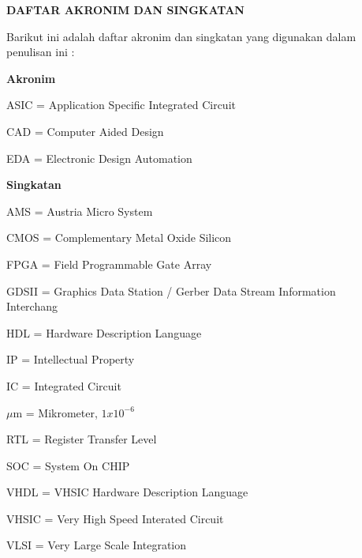 \newpage
{}
\singlespace
\begin{center}
\begin{large}\textbf{DAFTAR AKRONIM DAN SINGKATAN}\end{large}
\end{center}
 \vspace{1cm}
 Barikut ini adalah daftar akronim dan singkatan yang digunakan dalam penulisan ini :

 \noindent \begin{large}\textbf{Akronim}\end{large}
\begin{singlespacing}
\begin{abbreviations}
\item[ASIC] = Application Specific Integrated Circuit
\item[CAD] =  Computer Aided Design
\item[EDA] =  Electronic Design Automation

\end{abbreviations}

 \noindent \begin{large}\textbf{Singkatan}\end{large}
\begin{abbreviations}
\item[AMS] = Austria Micro System
\item[CMOS] = Complementary Metal Oxide Silicon
\item[FPGA] = Field Programmable Gate Array
\item[GDSII] = Graphics Data Station / Gerber Data Stream Information\\ Interchang
\item[HDL] = Hardware Description Language
\item[IP] = Intellectual Property
\item[IC] = Integrated Circuit
\item[$\mu$m] = Mikrometer, $1 x 10^{-6}$
\item[RTL] = Register Transfer Level
\item[SOC] = System On CHIP
\item[VHDL] = VHSIC Hardware Description Language
\item[VHSIC] = Very High Speed Interated Circuit
\item[VLSI] = Very Large Scale Integration
\end{abbreviations}
\end{singlespacing}